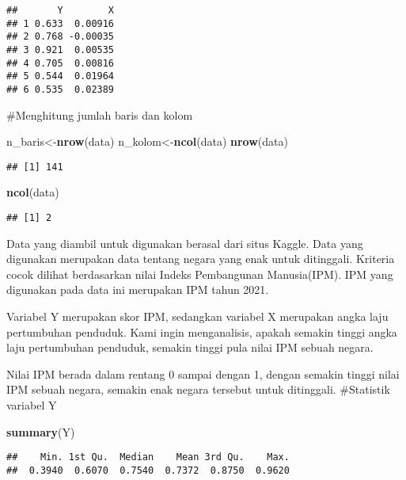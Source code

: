 \documentclass[
]{article}
\newenvironment{Shaded}{\begin{snugshade}}{\end{snugshade}}
\newcommand{\FunctionTok}[1]{\textcolor[rgb]{0.13,0.29,0.53}{\textbf{#1}}}
\newcommand{\NormalTok}[1]{#1}
\newcommand{\OtherTok}[1]{\textcolor[rgb]{0.56,0.35,0.01}{#1}}
\begin{document}
\begin{verbatim}
##       Y        X
## 1 0.633  0.00916
## 2 0.768 -0.00035
## 3 0.921  0.00535
## 4 0.705  0.00816
## 5 0.544  0.01964
## 6 0.535  0.02389
\end{verbatim}

\#Menghitung jumlah baris dan kolom

\begin{Shaded}
\begin{Highlighting}[]
\NormalTok{n\_baris}\OtherTok{\textless{}{-}}\FunctionTok{nrow}\NormalTok{(data)}
\NormalTok{n\_kolom}\OtherTok{\textless{}{-}}\FunctionTok{ncol}\NormalTok{(data)}
\FunctionTok{nrow}\NormalTok{(data)}
\end{Highlighting}
\end{Shaded}

\begin{verbatim}
## [1] 141
\end{verbatim}

\begin{Shaded}
\begin{Highlighting}[]
\FunctionTok{ncol}\NormalTok{(data)}
\end{Highlighting}
\end{Shaded}

\begin{verbatim}
## [1] 2
\end{verbatim}

Data yang diambil untuk digunakan berasal dari situs Kaggle. Data yang
digunakan merupakan data tentang negara yang enak untuk ditinggali.
Kriteria cocok dilihat berdasarkan nilai Indeks Pembangunan
Manusia(IPM). IPM yang digunakan pada data ini merupakan IPM tahun 2021.

Variabel Y merupakan skor IPM, sedangkan variabel X merupakan angka laju
pertumbuhan penduduk. Kami ingin menganalisis, apakah semakin tinggi
angka laju pertumbuhan penduduk, semakin tinggi pula nilai IPM sebuah
negara.

Nilai IPM berada dalam rentang 0 sampai dengan 1, dengan semakin tinggi
nilai IPM sebuah negara, semakin enak negara tersebut untuk ditinggali.
\#Statistik variabel Y

\begin{Shaded}
\begin{Highlighting}[]
\FunctionTok{summary}\NormalTok{(Y)}
\end{Highlighting}
\end{Shaded}

\begin{verbatim}
##    Min. 1st Qu.  Median    Mean 3rd Qu.    Max. 
##  0.3940  0.6070  0.7540  0.7372  0.8750  0.9620
\end{verbatim}
\end{document}
